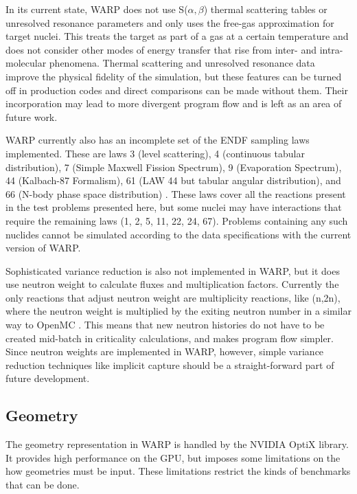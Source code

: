 \documentclass[preprint,12pt]{elsarticle}
\begin{document}
In its current state, WARP does not use S($\alpha,$$\beta$) thermal scattering tables or unresolved resonance parameters and only uses the free-gas approximation for target nuclei.  This treats the target as part of a gas at a certain temperature and does not consider other modes of energy transfer that rise from inter- and intra-molecular phenomena.  Thermal scattering and unresolved resonance data improve the physical fidelity of the simulation, but these features can be turned off in production codes and direct comparisons can be made without them.  Their incorporation may lead to more divergent program flow and is left as an area of future work.

WARP currently also has an incomplete set of the ENDF sampling laws implemented.   These are laws 3 (level scattering), 4 (continuous tabular distribution), 7 (Simple Maxwell Fission Spectrum), 9 (Evaporation Spectrum), 44 (Kalbach-87 Formalism), 61 (LAW 44 but tabular angular distribution), and 66 (N-body phase space distribution) \cite{MCNP}.  These laws cover all the reactions present in the test problems presented here, but some nuclei may have interactions that require the remaining laws (1, 2, 5, 11, 22, 24, 67). Problems containing any such nuclides cannot be simulated according to the data specifications with the current version of WARP.

Sophisticated variance reduction is also not implemented in WARP, but it does use neutron weight to calculate fluxes and multiplication factors.  Currently the only reactions that adjust neutron weight are multiplicity reactions, like (n,2n), where the neutron weight is multiplied by the exiting neutron number in a similar way to OpenMC \cite{openmc}.  This means that new neutron histories do not have to be created mid-batch in criticality calculations, and makes program flow simpler.  Since neutron weights are implemented in WARP, however, simple variance reduction techniques like implicit capture should be a straight-forward part of future development.

\subsection{Geometry}

The geometry representation in WARP is handled by the NVIDIA OptiX library.  It provides high performance on the GPU, but imposes some limitations on the how geometries must be input.  These limitations restrict the kinds of benchmarks that can be done.
\end{document}
